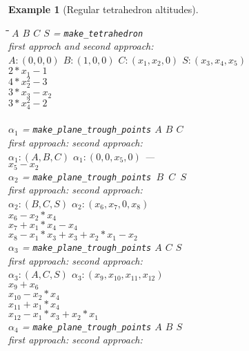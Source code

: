 \documentclass[final,1p,times,authoryear]{elsarticle}
\newtheorem{example}[theorem]{Example}
\begin{document}
\begin{example}[Regular tetrahedron altitudes]
\begin{footnotesize}
\begin{tabbing}
\hspace{5mm}\=\hspace{1cm}\=\hspace{1cm}\=\hspace{6cm}\=\kill
\> $A$ $B$ $C$ $S$ = {\tt make\_tetrahedron} \\
  \>\> first approch and second approach: \\
  \>\> $A: (0, 0, 0)$ $ B: (1, 0, 0)$  $C: (x_1, x_2, 0)$ $S: (x_3, x_4, x_5)$ \\
  \>\> $2*x_1  - 1$ \\
  \>\> $4*x_2^2  -3$ \\
  \>\> $3*x_3  -  x_2$ \\
  \>\> $3*x_4^2  -2$ \\ \\
\> $\alpha_1$ = {\tt make\_plane\_trough\_points} $A$ $B$ $C$ \\
\>\> first approach: \>\>second approach: \\
 \>\> $\alpha_1: (A, B, C)$ \>\> $\alpha_1 : (0, 0, x_5, 0)$ ---  \footnotemark[11]\\
 \>\>\> \>$x_5  -  x_2$ \\
\> $\alpha_2$ = {\tt make\_plane\_trough\_points $B$ $C$ $S$} \\
\>\> first approach: \>\> second approach: \\
\>\> $\alpha_2: (B, C, S)$ \>\>$\alpha_2 : (x_6, x_7, 0, x_8)$ \\
 \>\> \>\>$x_6  -  x_2*x_4$ \\
 \>\> \>\>$x_7  +  x_1*x_4  -  x_4$ \\
 \>\> \>\>$x_8  -  x_1*x_3  +  x_3  +  x_2*x_1  -  x_2$ \\
\> $\alpha_3$ = {\tt make\_plane\_trough\_points} $A$ $C$ $S$ \\
\>\> first approach: \>\> second approach: \\
\>\> $\alpha_3: (A, C, S)$ \>\> $\alpha_3 : (x_9, x_{10}, x_{11}, x_{12})$ \\
  \>\> \>\> $x_9  +  x_6$ \\
  \>\> \>\> $x_{10}  -  x_2*x_4$ \\
  \>\> \>\> $x_{11}  +  x_1*x_4$ \\
  \>\> \>\> $x_{12}  -  x_1*x_3  +  x_2*x_1$ \\
\> $\alpha_4$ = {\tt make\_plane\_trough\_points} $A$ $B$ $S$ \\
\>\> first approach: \> second approach: \\

\end{tabbing}
\end{footnotesize}
\end{example}
\end{document}

